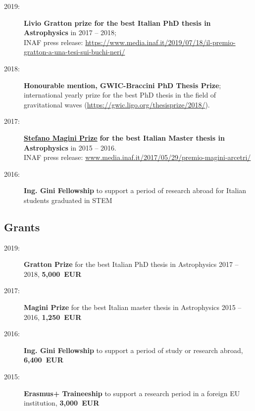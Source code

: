 \begin{description}

    \item[2019:] \textbf{Livio Gratton prize for the best Italian PhD thesis in Astrophysics} in 2017 -- 2018;\\ { INAF press release: \href{https://www.media.inaf.it/2019/07/18/il-premio-gratton-a-una-tesi-sui-buchi-neri/}{\small \normalfont https://www.media.inaf.it/2019/07/18/il-premio-gratton-a-una-tesi-sui-buchi-neri/}}

    \item[2018:] \textbf{Honourable mention, GWIC-Braccini PhD Thesis Prize}; international yearly prize for the best PhD thesis in the field of gravitational waves {\small (\href{https://gwic.ligo.org/thesisprize/2018/}{https://gwic.ligo.org/thesisprize/2018/})}. 

    \item[2017:] {\textbf{\href{https://www.arcetri.astro.it/ricerca/premio-stefano-magini}{Stefano Magini Prize}}} {\bf for the best Italian Master thesis in Astrophysics} in 2015 -- 2016.\\
    { INAF press release: \href{http://www.media.inaf.it/2017/05/29/premio-magini-arcetri/}{ \small www.media.inaf.it/2017/05/29/premio-magini-arcetri/}}

    \item[2016:]  {\textbf{Ing. Gini Fellowship}} to support a period of research abroad for Italian students graduated in STEM

\end{description}

\subsection*{Grants}

\begin{description}

    \item[2019:] {\bf Gratton Prize} for the best Italian PhD thesis in Astrophysics 2017 -- 2018,  {\bf 5,000~EUR}

    \item[2017:] {\bf Magini Prize} for the best Italian master thesis in Astrophysics 2015 -- 2016,  {\bf 1,250~EUR}

    \item[2016:]{ \bf Ing. Gini Fellowship} to support a period of study or research abroad,  {\bf 6,400~EUR}

    \item[2015:] {\bf Erasmus+ Traineeship} to support a research period  in a foreign EU institution,  {\bf 3,000~EUR}

\end{description}


